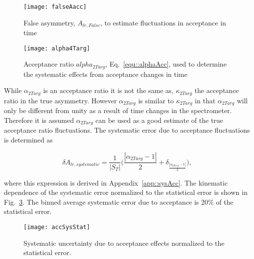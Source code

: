 \begin{figure}[h!t]
  \begin{center}
    \texttt{[image: falseAacc]}
    \caption{False asymmetry, $A_{lr,False}$, to estimate fluctuations in
      acceptance in time}
    \label{fig::falseAacc}
  \end{center}
\end{figure}

\begin{figure}[h!t]
  \begin{center}
    \texttt{[image: alpha4Targ]}
    \caption{Acceptance ratio $alpha_{2Targ}$, Eq.~\ref{equ::alphaAcc}, used to
      determine the systematic effects from acceptance changes in time}
    \label{fig::alpha}
  \end{center}
\end{figure}

While $\alpha_{2Targ}$ is an acceptance ratio it is not the same as,
$\kappa_{2Targ}$ the acceptance ratio in the true asymmetry.  However
$\alpha_{2Targ}$ is similar to $\kappa_{2Targ}$ in that $\alpha_{2Targ}$ will
only be different from unity as a result of time changes in the spectrometer.
Therefore it is assumed $\alpha_{2Targ}$ can be used as a good estimate of the
true acceptance ratio fluctuations.  The systematic error due to acceptance
fluctuations is determined as

\begin{equation}
  \delta A_{lr,systematic} =
  \frac{1}{|S_T|}
  \Big(\frac{|\alpha_{2Targ}-1|}{2}
  + \delta_{\frac{|\alpha_{2Targ}-1|}{2}} \Big),
\end{equation}

\noindent
where this expression is derived in Appendix~\ref{app::sysAcc}.  The kinematic
dependence of the systematic error normalized to the statistical error is shown
in Fig.~\ref{fig::accSysStat}.  The binned average systematic error due to
acceptance is 20\% of the statistical error.

\begin{figure}[h!t]
  \begin{center}
    \texttt{[image: accSysStat]}
    \caption{Systematic uncertainty due to acceptance effects normalized to the
      statistical error.}
    \label{fig::accSysStat}
  \end{center}
\end{figure}

